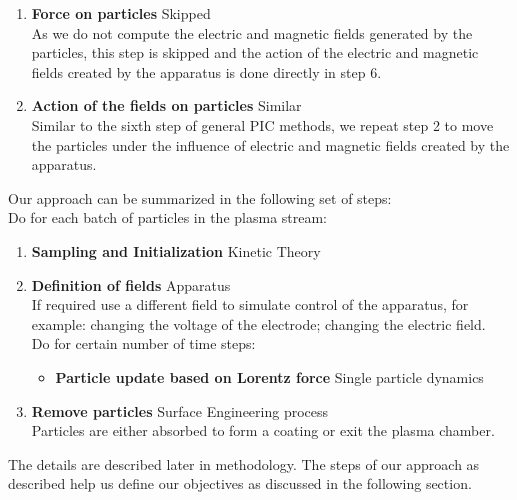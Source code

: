 \documentclass[12pt]{article}
\begin{document}
\begin{enumerate}
		\item \textbf{Force on particles} \hspace*{\fill}Skipped \phantom{text} \\
		As we do not compute the electric and magnetic fields generated by the particles, this step is skipped and the action of the electric and magnetic fields created by the apparatus is done directly in step 6. 
		\item \textbf{Action of the fields on particles} \hspace*{\fill}Similar \phantom{text} \\
		Similar to the sixth step of general PIC methods, we repeat step 2 to move the particles under the influence of electric and magnetic fields created by the apparatus.
	\end{enumerate}

	\noindent Our approach can be summarized in the following set of steps: \\
	\phantom{te} Do for each batch of particles in the plasma stream:
	\begin{enumerate}[itemsep=0cm]
		\item \textbf{Sampling and Initialization} \hspace*{\fill}Kinetic Theory \phantom{text}
		\item \textbf{Definition of fields} \hspace*{\fill}Apparatus \phantom{text} \\
		If required use a different field to simulate control of the apparatus, for example: changing the voltage of the electrode; changing the electric field.
		\vspace{0.2cm} \\Do for certain number of time steps:
		
		\begin{itemize}[itemsep=0cm]
			\item \textbf{Particle update based on Lorentz force} \hspace*{\fill}Single particle dynamics \phantom{text}
		\end{itemize}
		\item \textbf{Remove particles} \hspace*{\fill}Surface Engineering process \phantom{text}\\
		Particles are either absorbed to form a coating or exit the plasma chamber.
	\end{enumerate}
	The details are described later in methodology. The steps of our approach as described help us define our objectives as discussed in the following section.
	
\end{document}
